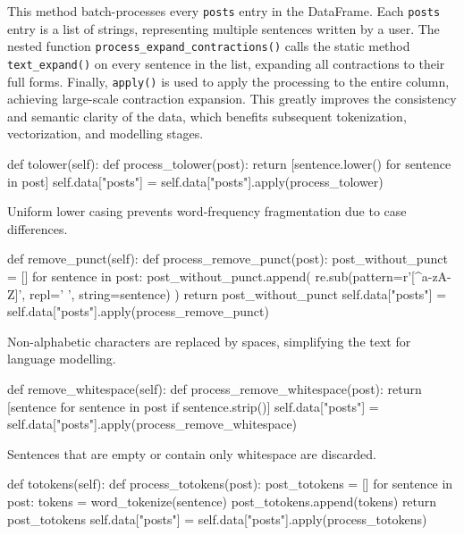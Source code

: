 \documentclass[12pt]{article}
\numberwithin{figure}{section}  %
\begin{document}
\begin{enumerate}
This method batch-processes every \texttt{posts} entry in the DataFrame. Each
\texttt{posts} entry is a list of strings, representing multiple sentences
written by a user. The nested function \texttt{process\_expand\_contractions()}
calls the static method \texttt{text\_expand()} on every sentence in the list,
expanding all contractions to their full forms.  
Finally, \texttt{apply()} is used to apply the processing to the entire column,
achieving large-scale contraction expansion. This greatly improves the
consistency and semantic clarity of the data, which benefits subsequent
tokenization, vectorization, and modelling stages.

\begin{python}
def tolower(self):
    def process_tolower(post):
        return [sentence.lower() for sentence in post]
    self.data["posts"] = self.data["posts"].apply(process_tolower)
\end{python}

Uniform lower casing prevents word-frequency fragmentation due to case
differences.

\begin{python}
def remove_punct(self):
    def process_remove_punct(post):
        post_without_punct = []
        for sentence in post:
            post_without_punct.append(
                re.sub(pattern=r'[^a-zA-Z\s]', repl=' ', string=sentence)
            )
        return post_without_punct
    self.data["posts"] = self.data["posts"].apply(process_remove_punct)
\end{python}

Non-alphabetic characters are replaced by spaces, simplifying the text for
language modelling.

\begin{python}
def remove_whitespace(self):
    def process_remove_whitespace(post):
        return [sentence for sentence in post if sentence.strip()]
    self.data["posts"] = self.data["posts"].apply(process_remove_whitespace)
\end{python}

Sentences that are empty or contain only whitespace are discarded.

\begin{python}
def totokens(self):
    def process_totokens(post):
        post_totokens = []
        for sentence in post:
            tokens = word_tokenize(sentence)
            post_totokens.append(tokens)
        return post_totokens
    self.data["posts"] = self.data["posts"].apply(process_totokens)
\end{python}


\end{enumerate}
\end{document}
